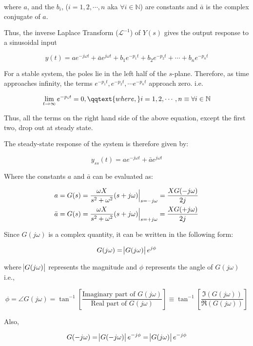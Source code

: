 \documentclass[
  14pt,
  a4paper,
  oneside,
  open=any,
  a4paper,
  14pt]{report}
\begin{document}
where \(a\), and the \(b_i\), (\(i = 1, 2, \cdots, n\) aka
\(\forall i \in \mathbb{N}\)) are constants and \(\bar{a}\) is the
complex conjugate of \(a\).

Thus, the inverse Laplace Transform (\(\mathcal{L}^{-1}\)) of \(Y(s)\)
gives the output response to a sinusoidal input

\[
    y(t) = ae^{-j\omega t} + \bar{a}e^{j\omega t} + b_1e^{-p_1t} + b_2e^{-p_2t} + \cdots + b_ne^{-p_nt}
\]

For a stable system, the poles lie in the left half of the \(s\)-plane.
Therefore, as time approaches infinity, the terms
\(e^{-p_1t}, e^{-p_2t},\cdots e^{-p_nt}\) approach zero. i.e.

\[
    \lim\limits_{t \to \infty} e^{-p_it} = 0, \qqtext{where,} i = 1, 2, \cdots, n \equiv \forall i \in \mathbb{N}
\]

Thus, all the terms on the right hand side of the above equation, except
the first two, drop out at steady state.

The steady-state response of the system is therefore given by:

\[
    y_{ss}(t) = ae^{-j\omega t} + \bar{a}e^{j\omega t}
\]

Where the constants \(a\) and \(\bar{a}\) can be evaluated as:

\[
\begin{aligned}
    a &= G(s) = \dfrac{\omega X}{s^2 + \omega^2}(s+j\omega) \Big|_{s = -j\omega} = \dfrac{XG(-j\omega)}{\complexnum[output-complex-root=j]{2j}} \\
    \bar{a} &= G(s) = \dfrac{\omega X}{s^2 + \omega^2}(s+j\omega) \Big|_{s = +j\omega} = \dfrac{XG(+j\omega)}{\complexnum[output-complex-root=j]{2j}}
\end{aligned}
\]

Since \(G(j\omega)\) is a complex quantity, it can be written in the
following form:

\[
    G(j\omega) = \abs{G(j\omega)}e^{j\phi}
\]

where \(\abs{G(j\omega)}\) represents the magnitude and \(\phi\)
represents the angle of \(G(j\omega)\) i.e.,

\[
    \phi = \angle G(j\omega) = \tan^{-1} \left[\dfrac{\text{Imaginary part of } G(j\omega)}{\text{Real part of } G(j\omega)} \right] \equiv \tan^{-1} \left[\dfrac{\Im(G(j\omega))}{\Re(G(j\omega))} \right]
\]

Also,

\[
    G(-j\omega) = \abs{G(-j\omega)}e^{-j\phi} = \abs{G(j\omega)}e^{-j\phi}
\]
\end{document}
